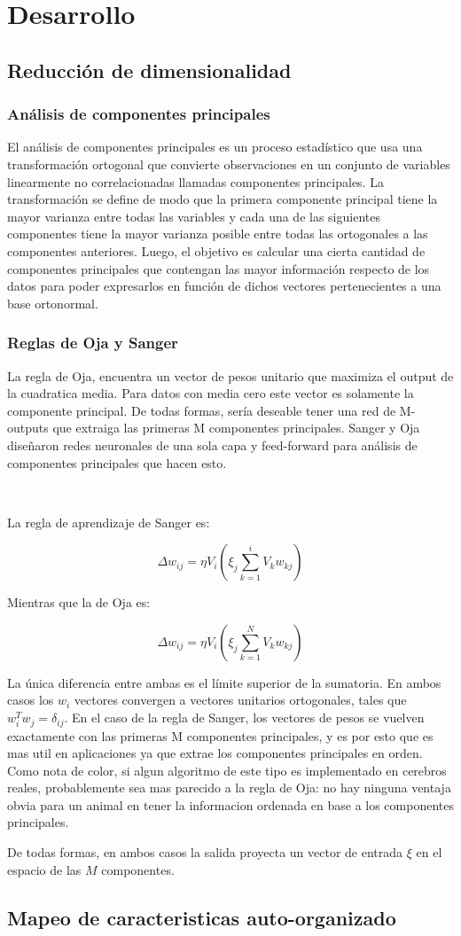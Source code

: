 \documentclass[informe.tex]{subfiles}
\begin{document}
  
  \section{Desarrollo}
    \subsection{Reducción de dimensionalidad}
      \subsubsection{Análisis de componentes principales}
	El an\'alisis de componentes principales es un proceso estadístico que usa una transformaci\'on ortogonal que convierte observaciones en un conjunto de variables linearmente no correlacionadas llamadas componentes principales. La transformación se define de modo que la primera componente principal tiene la mayor varianza entre todas las variables y cada una de las siguientes componentes tiene la mayor varianza posible entre todas las ortogonales a las componentes anteriores. Luego, el objetivo es calcular una cierta cantidad de componentes principales que contengan las mayor información respecto de los datos para poder expresarlos en función de dichos vectores pertenecientes a una base ortonormal.
      
      \subsubsection{Reglas de Oja y Sanger}
	La regla de Oja, encuentra un vector de pesos unitario que maximiza el output de la cuadratica media. Para datos con media cero este vector es solamente la componente principal. De todas formas, sería deseable tener una red de M-outputs que extraiga las primeras M componentes principales. Sanger y Oja diseñaron redes neuronales de una sola capa y feed-forward para análisis de componentes principales que hacen esto.
	
	~
	
	La regla de aprendizaje de Sanger es:

	$$\Delta w_{ij} = \eta V_i(\xi_j \sum_{k=1}^{i} V_k w_{kj} )$$

	Mientras que la de Oja es:

	$$\Delta w_{ij} = \eta V_i(\xi_j \sum_{k=1}^{N} V_k w_{kj} )$$

	La única diferencia entre ambas es el límite superior de la sumatoria. En ambos casos los $w_i$ vectores convergen a vectores unitarios ortogonales, tales que $w^{T}_i w_j = \delta_{ij}$. En el caso de la regla de Sanger, los vectores de pesos se vuelven exactamente con las primeras M componentes principales, y es por esto que es mas util en aplicaciones ya que extrae los componentes principales en orden. Como nota de color, si algun algoritmo de este tipo es implementado en cerebros reales, probablemente sea mas parecido a la regla de Oja: no hay ninguna ventaja obvia para un animal en tener la informacion ordenada en base a los componentes principales. 

	De todas formas, en ambos casos la salida proyecta un vector de entrada $\xi$ en el espacio de las $M$ componentes.
    \subsection{Mapeo de caracteristicas auto-organizado}
  
\end{document}
